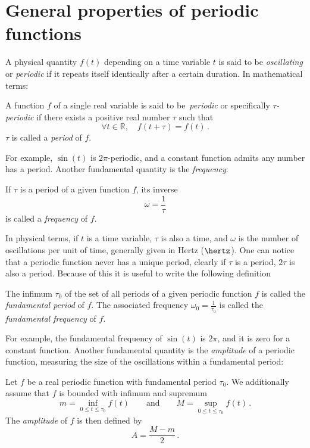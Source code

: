 \section{General properties of periodic functions}
A physical quantity $f(t)$ depending on a time variable $t$ is said to be
\emph{oscillating} or \emph{periodic} if it repeats itself identically after a certain
duration. In mathematical terms:
\begin{definition}
  A function $f$ of a single real variable is said to be~\emph{periodic} or specifically
  \emph{$\tau$-periodic} if there exists a positive real number $\tau$ such that
  \begin{equation}
    \forall t\in\mathbb{R},\quad f(t+\tau)=f(t)\,.
  \end{equation}
  $\tau$ is called a \emph{period} of $f$.
\end{definition}
\noindent For example, $\sin(t)$ is $2\pi$-periodic, and a constant function admits any
number has a period. Another fundamental quantity is the \emph{frequency}:
\begin{definition}
  If $\tau$ is a period of a given function $f$, its inverse
  \begin{equation}
    \omega=\frac{1}{\tau}
  \end{equation}
  is called a \emph{frequency} of $f$.
\end{definition}
\noindent In physical terms, if $t$ is a time variable, $\tau$ is also a time, and
$\omega$ is the number of oscillations per unit of time, generally given in Hertz
($\hertz$). One can notice that a periodic function never has a unique period, \eg clearly
if $\tau$ is a period, $2\tau$ is also a period. Because of this it is useful to write the
following definition
\begin{definition}
  The infimum $\tau_0$ of the set of all periods of a given periodic function $f$ is
  called the \emph{fundamental period} of $f$. The associated frequency
  $\omega_0=\frac{1}{\tau_0}$ is called the \emph{fundamental frequency} of $f$.
\end{definition}
\noindent For example, the fundamental frequency of $\sin(t)$ is $2\pi$, and it is zero
for a constant function. Another fundamental quantity is the \emph{amplitude} of a
periodic function, measuring the size of the oscillations within a fundamental period:
\begin{definition}
  \label{def:amplitude}
  Let $f$ be a real periodic function with fundamental period $\tau_0$. We additionally
  assume that $f$ is bounded with infimum and supremum
  \begin{equation}
    m=\inf_{0\leq t\leq \tau_0}f(t)\qquad\text{and}\qquad M=\sup_{0\leq t\leq \tau_0}f(t)\,.
  \end{equation}
  The \emph{amplitude} of $f$ is then defined by
  \begin{equation}
    A=\frac{M-m}{2}\,.
  \end{equation}
\end{definition}
